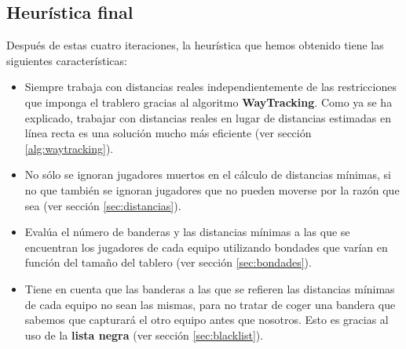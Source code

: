 \subsection {Heurística final}
Después de estas cuatro iteraciones, la heurística que hemos obtenido
tiene las siguientes características:
\begin{itemize}
\item Siempre trabaja con distancias reales independientemente de las
  restricciones que imponga el trablero gracias al algoritmo
  \textbf{WayTracking}. Como ya se ha explicado, trabajar con
  distancias reales en lugar de distancias estimadas en línea recta es
  una solución mucho más eficiente (ver sección \ref{alg:waytracking}).
\item No sólo se ignoran jugadores muertos en el cálculo de distancias
  mínimas, si no que también se ignoran jugadores que no pueden
  moverse por la razón que sea (ver sección \ref{sec:distancias}).
\item Evalúa el número de banderas y las distancias mínimas a las que
  se encuentran los jugadores de cada equipo utilizando bondades que
  varían en función del tamaño del tablero (ver sección \ref{sec:bondades}).
\item Tiene en cuenta que las banderas a las que se refieren las
  distancias mínimas de cada equipo no sean las mismas, para no tratar
  de coger una bandera que sabemos que capturará el otro equipo antes
  que nosotros. Esto es gracias al uso de la \textbf{lista negra} (ver
  sección \ref{sec:blacklist}).
\end{itemize}